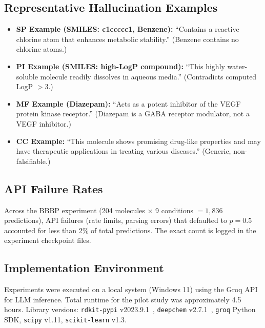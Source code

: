 \subsection{Representative Hallucination Examples}
\begin{itemize}
    \item \textbf{SP Example (SMILES: c1ccccc1, Benzene):} ``Contains a reactive chlorine atom that enhances metabolic stability.'' (Benzene contains no chlorine atoms.)
    \item \textbf{PI Example (SMILES: high-LogP compound):} ``This highly water-soluble molecule readily dissolves in aqueous media.'' (Contradicts computed LogP $> 3$.)
    \item \textbf{MF Example (Diazepam):} ``Acts as a potent inhibitor of the VEGF protein kinase receptor.'' (Diazepam is a GABA receptor modulator, not a VEGF inhibitor.)
    \item \textbf{CC Example:} ``This molecule shows promising drug-like properties and may have therapeutic applications in treating various diseases.'' (Generic, non-falsifiable.)
\end{itemize}

\subsection{API Failure Rates}\label{subsec:api_failures}
Across the BBBP experiment (204 molecules $\times$ 9 conditions $= 1{,}836$ predictions), API failures (rate limits, parsing errors) that defaulted to $p = 0.5$ accounted for less than 2\% of total predictions. The exact count is logged in the experiment checkpoint files.

\subsection{Implementation Environment}
Experiments were executed on a local system (Windows 11) using the Groq API for LLM inference. Total runtime for the pilot study was approximately 4.5 hours. Library versions: \texttt{rdkit-pypi} v2023.9.1~\cite{landrum2023rdkit}, \texttt{deepchem} v2.7.1~\cite{ramsundar2019deepchem}, \texttt{groq} Python SDK, \texttt{scipy} v1.11, \texttt{scikit-learn} v1.3.

